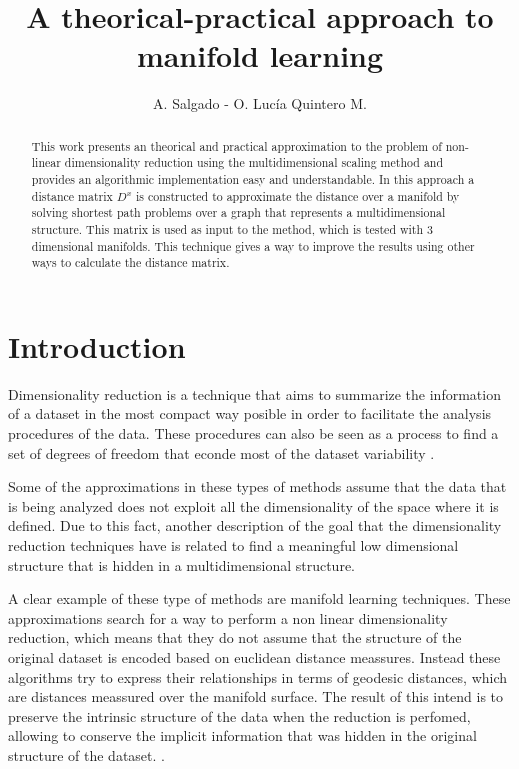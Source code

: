 \documentclass[12pt,journal]{IEEEtran}
\begin{document}
\title{A theorical-practical approach to manifold learning}
\author{A. Salgado - O. Lucía Quintero M.}
\maketitle

\begin{abstract}
    This work presents an theorical and practical approximation to the problem
    of non-linear dimensionality reduction using the multidimensional scaling
    method and provides an algorithmic implementation easy and understandable. In
    this approach a distance matrix $D^x$ is constructed to approximate the
    distance over a manifold by solving shortest path problems over a graph that
    represents a multidimensional structure. This matrix is used as input to the
    method, which is tested with 3 dimensional manifolds. This technique gives a
    way to improve the results using other ways to calculate the distance matrix.
\end{abstract}

\section{Introduction}

Dimensionality reduction is a technique that aims to summarize the information
of a dataset in the most compact way posible in order to facilitate the analysis
procedures of the data. These procedures can also be seen as a process to find
a set of degrees of freedom that econde most of the dataset variability
\cite{proof}.

\vspace{0.5cm}

Some of the approximations in these types of methods assume that the data that
is being analyzed does not exploit all the dimensionality of the space where
it is defined. Due to this fact, another description of the goal that the
dimensionality reduction techniques have is related to find a meaningful low
dimensional structure that is hidden in a multidimensional structure.
\cite{dimension}

\vspace{0.5cm}

A clear example of these type of methods are manifold learning techniques. These
approximations search for a way to perform a non linear dimensionality reduction,
which means that they do not assume that the structure of the original dataset
is encoded based on euclidean distance meassures. Instead these algorithms try
to express their relationships in terms of geodesic distances, which are
distances meassured over the manifold surface. The result of this intend is
to preserve the intrinsic structure of the data when the reduction is perfomed,
allowing to conserve the implicit information that was hidden in the original
structure of the dataset. \cite{manifold}.
\end{document}
